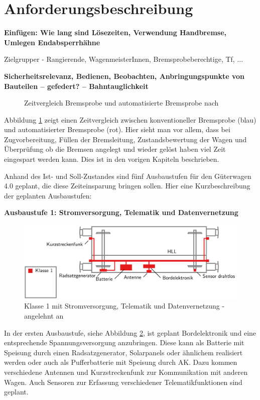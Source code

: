 \section{Anforderungsbeschreibung}
\textbf{Einfügen: Wie lang sind Lösezeiten, Verwendung Handbremse, Umlegen Endabsperrhähne}\par
Zielgrupper - Rangierende, WagenmeisterInnen, Bremsprobeberechtige, Tf, ...\par
\textbf{Sicherheitsrelevanz, Bedienen, Beobachten, Anbringungspunkte von Bauteilen -- gefedert? -- Bahntauglichkeit}\par
\begin{figure}[htbp] 
    
    \caption{Zeitvergleich Bremsprobe und automatisierte Bremsprobe nach \cite{Stephenson}}
    \label{fig:Zeitvergleich}
\end{figure} 
Abbildung \ref{fig:Zeitvergleich} zeigt einen Zeitvergleich zwischen konventioneller Bremsprobe (blau) und automatisierter Bremsprobe (rot). Hier sieht man vor allem, dass  bei Zugvorbereitung, Füllen der Bremsleitung, Zustandsbewertung der Wagen und Überprüfung ob die Bremsen angelegt und wieder gelöst haben viel Zeit eingespart werden kann. Dies ist in den vorigen Kapiteln beschrieben.\par
Anhand des Ist- und Soll-Zustandes sind fünf Ausbaustufen für den Güterwagen 4.0 geplant, die diese Zeiteinsparung bringen sollen. Hier eine Kurzbeschreibung der geplanten Ausbaustufen:\par
\textbf{Ausbaustufe 1: Stromversorgung, Telematik und Datenvernetzung}\par
\begin{figure}[hbp] 
    \includegraphics[width=\textwidth]{Bilder/Ausbaustufen_1.PNG}
    \caption{Klasse 1 mit Stromversorgung, Telematik und Datenvernetzung - angelehnt an \cite{ETR_3} }
    \label{fig:Klasse1}
\end{figure} 
In der ersten Ausbaustufe, siehe Abbildung \ref{fig:Klasse1}, ist geplant Bordelektronik und eine entsprechende Spannungsversorgung anzubringen. Diese kann als Batterie mit Speisung durch einen Radsatzgenerator, Solarpanels oder ähnlichem realisiert werden oder auch als Pufferbatterie mit Speisung durch AK. Dazu kommen verschiedene Antennen und Kurzstreckenfunk zur Kommunikation mit anderen Wagen. Auch Sensoren zur Erfassung verschiedener Telematikfunktionen sind geplant.\par
